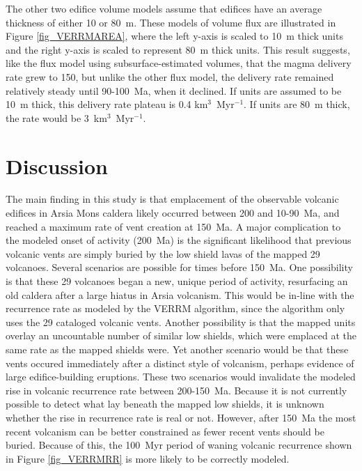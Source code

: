 \documentclass[12pt,letter]{article}
\begin{document}
The other two edifice volume models assume that edifices have an average thickness of either 10 or 80~m. These models of volume flux are illustrated in Figure \ref{fig_VERRMAREA}, where the left y-axis is scaled to 10~m thick units and the right y-axis is scaled to represent 80~m thick units. This result suggests, like the flux model using subsurface-estimated volumes, that the  magma delivery rate grew to 150, but unlike the other flux model, the delivery rate remained relatively steady until 90-100~Ma, when it declined. If units are assumed to be 10~m thick, this delivery rate plateau is 0.4 km$^3$~Myr$^{-1}$. If units are 80~m thick, the rate would be 3~km$^3$~Myr$^{-1}$.


\section{Discussion}
The main finding in this study is that emplacement of the observable volcanic edifices in Arsia Mons caldera likely occurred between 200 and 10-90~Ma, and reached a maximum rate of vent creation at 150~Ma. A major complication to the modeled onset of activity (200~Ma) is the significant likelihood that previous volcanic vents are simply buried by the low shield lavas of the mapped 29 volcanoes. Several scenarios are possible for times before 150~Ma. One possibility is that these 29 volcanoes began a new, unique period of activity, resurfacing an old caldera after a large hiatus in Arsia volcanism. This would be in-line with the recurrence rate as modeled by the VERRM algorithm, since the algorithm only uses the 29 cataloged volcanic vents. Another possibility is that the mapped units overlay an uncountable number of similar low shields, which were emplaced at the same rate as the mapped shields were. Yet another scenario would be that these vents occured immediately after a distinct style of volcanism, perhaps evidence of large edifice-building eruptions. These two scenarios would invalidate the modeled rise in volcanic recurrence rate between 200-150~Ma. Because it is not currently possible to detect what lay beneath the mapped low shields, it is unknown whether the rise in recurrence rate is real or not. However, after 150~Ma the most recent volcanism can be better constrained as fewer recent vents should be buried. Because of this, the 100~Myr period of waning volcanic recurrence shown in Figure \ref{fig_VERRMRR} is more likely to be correctly modeled.
\end{document}
